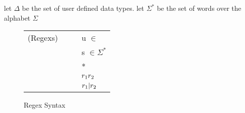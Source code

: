 \documentclass{article}
\begin{document}
let $\Delta$ be the set of user defined data types.
let $\Sigma^*$ be the set of words over the alphabet $\Sigma$

\begin{figure}
\begin{tabular}{l@{\ }l@{\ }c@{\ }l}

(Regexs)& \Regex{} & \GEq{} & u $\in$ \TypeContext{} \\
& & & \GBar{} s $\in \Sigma^*$ \\
& & & \GBar{} \Regex{}* \\
& & & \GBar{} $r_1 r_2$ \\
& & & \GBar{} $r_1 | r_2$ \\
\end{tabular}
\caption{Regex Syntax}
\label{fig:refn-subgrammars}
\end{figure}
\end{document}
